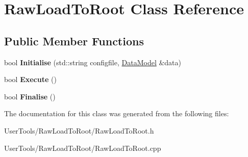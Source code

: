 \hypertarget{classRawLoadToRoot}{
\section{RawLoadToRoot Class Reference}
\label{classRawLoadToRoot}
}
\subsection*{Public Member Functions}
\begin{DoxyCompactItemize}
\item 
\hypertarget{classRawLoadToRoot_a418fe1aee31a54f78f58a149b42681a7}{
bool {\bfseries Initialise} (std::string configfile, \hyperlink{classDataModel}{DataModel} \&data)}
\label{classRawLoadToRoot_a418fe1aee31a54f78f58a149b42681a7}

\item 
\hypertarget{classRawLoadToRoot_ad7b372c9dbe8575d276ffc7c3e8cb343}{
bool {\bfseries Execute} ()}
\label{classRawLoadToRoot_ad7b372c9dbe8575d276ffc7c3e8cb343}

\item 
\hypertarget{classRawLoadToRoot_ae5bde44a885e69d0dabe6fc8b39f607e}{
bool {\bfseries Finalise} ()}
\label{classRawLoadToRoot_ae5bde44a885e69d0dabe6fc8b39f607e}

\end{DoxyCompactItemize}


The documentation for this class was generated from the following files:\begin{DoxyCompactItemize}
\item 
UserTools/RawLoadToRoot/RawLoadToRoot.h\item 
UserTools/RawLoadToRoot/RawLoadToRoot.cpp\end{DoxyCompactItemize}
